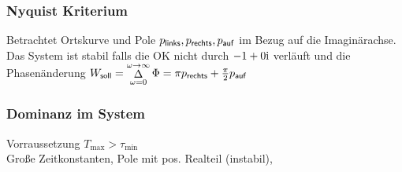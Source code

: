 \documentclass[fs, footer]{latex4ei}
\begin{document}
\begin{multicols*}{4}
{	\subsubsection{Nyquist Kriterium}
	Betrachtet Ortskurve und Pole $p_{\sf links}, p_{\sf rechts}, p_{\sf auf}$ im Bezug auf die Imaginärachse.
	Das System ist stabil falls die OK nicht durch $-1 + 0\mathrm{i}$ verläuft und die Phasenänderung
	$W_{\sf soll} = \mathop{\Delta}\limits_{\omega = 0}^{\omega \rightarrow \infty} \Phi = \pi p_{\sf rechts} + \frac{\pi}{2} p_{\sf auf}$


	\subsubsection{Dominanz im System}
	Vorraussetzung $T_{\max} > \tau_{\min}$\\
	Große Zeitkonstanten, Pole mit pos. Realteil (instabil),\\ 
}


\end{multicols*}
\end{document}
